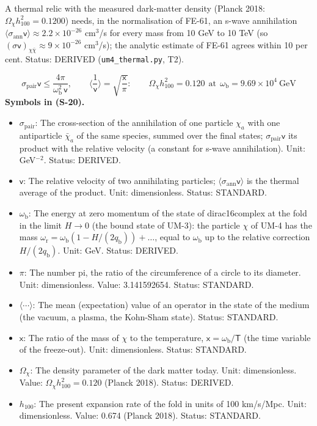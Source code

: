 \documentclass[
  10pt,
]{article}
\providecommand{\tightlist}{%
  \setlength{\itemsep}{0pt}\setlength{\parskip}{0pt}}
\begin{document}
A thermal relic with the measured dark-matter density (Planck 2018:
\(\Omega_\chi h_{100}^2 = 0.1200\)) needs, in the normalisation of
FE-61, an s-wave annihilation
\(\langle\sigma_{\mathrm{ann}}\mathsf{v}\rangle \approx 2.2\times10^{-26}\)
cm\(^3\)/s for every mass from 10 GeV to 10 TeV (so
\((\sigma\mathsf{v})_{\chi\bar\chi} \approx 9\times10^{-26}\)
cm\(^3\)/s); the analytic estimate of FE-61 agrees within 10 per cent.
Status: DERIVED (\texttt{um4\_thermal.py}, T2).

\[
\sigma_{\mathrm{pair}}\mathsf{v} \le \frac{4\pi}{\omega_{\mathrm{b}}^2\,\mathsf{v}},\qquad \Big\langle\frac{1}{\mathsf{v}}\Big\rangle = \sqrt{\frac{\mathsf{x}}{\pi}}:\qquad
\Omega_\chi h_{100}^2 = 0.120\ \ \text{at}\ \ \omega_{\mathrm{b}} = 9.69\times10^4\ \text{GeV} \tag{S-20}
\] \textbf{Symbols in (S-20).}

\begin{itemize}
\tightlist
\item
  \(\sigma_{\mathrm{pair}}\): The cross-section of the annihilation of
  one particle \(\chi_a\) with one antiparticle \(\bar\chi_a\) of the
  same species, summed over the final states;
  \(\sigma_{\mathrm{pair}}\mathsf{v}\) its product with the relative
  velocity (a constant for s-wave annihilation). Unit: GeV\(^{-2}\).
  Status: DERIVED.
\item
  \(\mathsf{v}\): The relative velocity of two annihilating particles;
  \(\langle\sigma_{\mathrm{ann}}\mathsf{v}\rangle\) is the thermal
  average of the product. Unit: dimensionless. Status: STANDARD.
\item
  \(\omega_{\mathrm{b}}\): The energy at zero momentum of the state of
  dirac16complex at the fold in the limit \(H \to 0\) (the bound state
  of UM-3): the particle \(\chi\) of UM-4 has the mass
  \(\omega_{\mathrm{r}} = \omega_{\mathrm{b}}(1 - H/(2q_{\mathrm{b}})) + \dots\),
  equal to \(\omega_{\mathrm{b}}\) up to the relative correction
  \(H/(2q_{\mathrm{b}})\). Unit: GeV. Status: DERIVED.
\item
  \(\pi\): The number pi, the ratio of the circumference of a circle to
  its diameter. Unit: dimensionless. Value: 3.141592654. Status:
  STANDARD.
\item
  \(\langle\cdots\rangle\): The mean (expectation) value of an operator
  in the state of the medium (the vacuum, a plasma, the Kohn-Sham
  state). Status: STANDARD.
\item
  \(\mathsf{x}\): The ratio of the mass of \(\chi\) to the temperature,
  \(\mathsf{x} = \omega_{\mathrm{b}}/\mathsf{T}\) (the time variable of
  the freeze-out). Unit: dimensionless. Status: STANDARD.
\item
  \(\Omega_\chi\): The density parameter of the dark matter today. Unit:
  dimensionless. Value: \(\Omega_\chi h_{100}^2 = 0.120\) (Planck 2018).
  Status: DERIVED.
\item
  \(h_{100}\): The present expansion rate of the fold in units of 100
  km/s/Mpc. Unit: dimensionless. Value: 0.674 (Planck 2018). Status:
  STANDARD.
\end{itemize}
\end{document}
